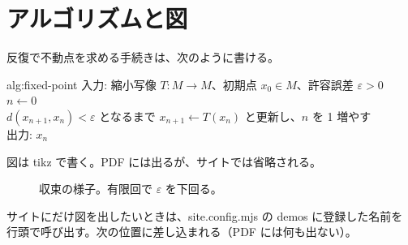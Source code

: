 \section{アルゴリズムと図}
\label{sec:extras}

反復で不動点を求める手続きは、次のように書ける。

\begin{algorithm}{alg:fixed-point}
入力: 縮小写像 $T \colon M \to M$、初期点 $x_0 \in M$、許容誤差 $\varepsilon > 0$ \\
$n \leftarrow 0$ \\
$d(x_{n+1}, x_n) < \varepsilon$ となるまで $x_{n+1} \leftarrow T(x_n)$ と更新し、$n$ を 1 増やす \\
出力: $x_n$
\end{algorithm}

図は tikz で書く。PDF には出るが、サイトでは省略される。

\begin{figure}[H]
  \centering
  \caption{収束の様子。有限回で $\varepsilon$ を下回る。}
  \label{fig:convergence}
\end{figure}

サイトにだけ図を出したいときは、site.config.mjs の demos に登録した名前を
行頭で呼び出す。次の位置に差し込まれる（PDF には何も出ない）。

